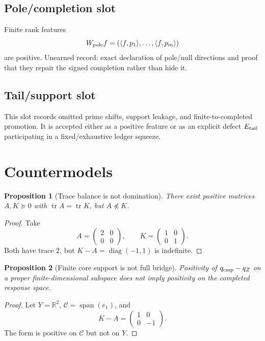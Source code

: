 \documentclass[11pt]{article}
\newtheorem{proposition}{Proposition}
\begin{document}
\subsection*{Pole/completion slot}
Finite rank features
\[
 W_{\rm pole}f=(\langle f,p_1\rangle,\ldots,\langle f,p_m\rangle)
\]
are positive. Unearned record: exact declaration of pole/null directions and proof that they repair the signed completion rather than hide it.

\subsection*{Tail/support slot}
This slot records omitted prime shifts, support leakage, and finite-to-completed promotion.  It is accepted either as a positive feature or as an explicit defect \(E_{\rm tail}\) participating in a fixed/exhaustive ledger squeeze.

\section{Countermodels}

\begin{proposition}[Trace balance is not domination]
There exist positive matrices \(A,K\succeq0\) with \(\operatorname{tr}A=\operatorname{tr}K\), but \(A\npreceq K\).
\end{proposition}

\begin{proof}
Take
\[
 A=\begin{pmatrix}2&0\\0&0\end{pmatrix},\qquad
 K=\begin{pmatrix}1&0\\0&1\end{pmatrix}.
\]
Both have trace \(2\), but \(K-A=\operatorname{diag}(-1,1)\) is indefinite.
\end{proof}

\begin{proposition}[Finite core support is not full bridge]
Positivity of \(q_{\rm cmp}-q_Z\) on a proper finite-dimensional subspace does not imply positivity on the completed response space.
\end{proposition}

\begin{proof}
Let \(Y=\mathbb R^2\), \(\mathcal C=\operatorname{span}(e_1)\), and
\[
 K-A=\begin{pmatrix}1&0\\0&-1\end{pmatrix}.
\]
The form is positive on \(\mathcal C\) but not on \(Y\).
\end{proof}
\end{document}
